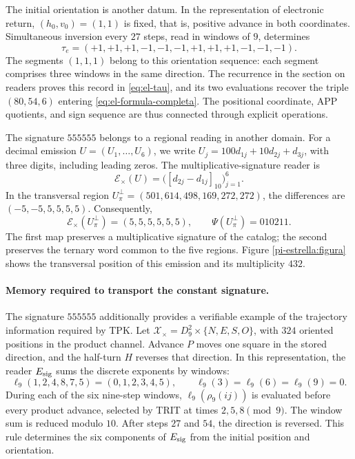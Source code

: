 The initial orientation is another datum. In the representation of
electronic return, \((h_0,v_0)=(1,1)\) is fixed, that is, positive
advance in both coordinates. Simultaneous inversion every \(27\)
steps, read in windows of \(9\), determines
\[
 \tau_e=(+1,+1,+1,-1,-1,-1,+1,+1,+1,-1,-1,-1).
\]
The segments \((1,1,1)\) belong to this orientation sequence:
each segment comprises three windows in the same direction. The recurrence
in the section on readers proves this record in
\eqref{eq:el-tau}, and its two evaluations recover the triple
\((80,54,6)\) entering
\eqref{eq:el-formula-completa}. The positional coordinate,
APP quotients, and sign sequence are thus connected through
explicit operations.

The signature \(555555\) belongs to a regional reading in another
domain. For a decimal emission \(U=(U_1,\ldots,U_6)\), we write
\(U_j=100d_{1j}+10d_{2j}+d_{3j}\), with three digits, including
leading zeros. The multiplicative-signature reader is
\[
 \mathcal E_\times(U)
   =\bigl([d_{2j}-d_{1j}]_{10}\bigr)_{j=1}^{6}.
\]
In the transversal region
\(U_\pi^\perp=(501,614,498,169,272,272)\), the differences are
\((-5,-5,5,5,5,5)\). Consequently,
\begin{equation}
 \mathcal E_\times(U_\pi^\perp)=(5,5,5,5,5,5),\qquad
 \Psi(U_\pi^\perp)=010211.
 \label{el-centro:firma-transversal}
\end{equation}
The first map preserves a multiplicative signature of the catalog;
the second preserves the ternary word common to the five regions.
Figure \ref{pi-estrella:figura} shows the transversal position of
this emission and its multiplicity \(432\).

\paragraph{Memory required to transport the constant signature.}
The signature \(555555\) additionally provides a verifiable example of
the trajectory information required by TPK. Let
\(\mathcal X_\times=D_9^2\times\{N,E,S,O\}\), with \(324\)
oriented positions in the product channel. Advance \(P\) moves
one square in the stored direction, and the half-turn \(H\)
reverses that direction. In this representation, the reader
\(E_{\rm sig}\) sums the discrete exponents by windows:
\[
 \ell_9(1,2,4,8,7,5)=(0,1,2,3,4,5),\qquad
 \ell_9(3)=\ell_9(6)=\ell_9(9)=0.
\]
During each of the six nine-step windows,
\(\ell_9(\rho_9(ij))\) is evaluated before every product advance, selected
by TRIT at times \(2,5,8\pmod9\). The window sum is
reduced modulo \(10\). After steps \(27\) and \(54\), the
direction is reversed. This rule determines the six components of
\(E_{\rm sig}\) from the initial position and orientation.

